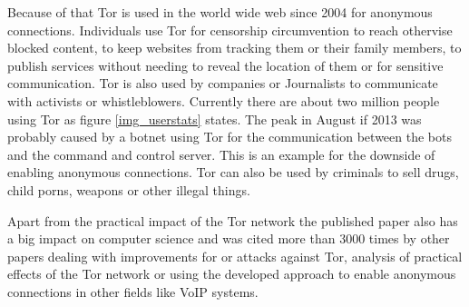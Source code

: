 Because of that Tor is used in the world wide web since 2004 for anonymous connections. Individuals use Tor for censorship circumvention to reach othervise blocked content, to keep websites from tracking them or their family members, to publish services without needing to reveal the location of them or for sensitive communication. Tor is also used by companies or Journalists to communicate with activists or whistleblowers\cite{tor}. Currently there are about two million people using Tor as figure \ref{img_userstats} states. The peak in August if 2013 was probably caused by a botnet using Tor for the communication between the bots and the command and control server\cite{torblog_botnet}. This is an example for the downside of enabling anonymous connections. Tor can also be used by criminals to sell drugs, child porns, weapons or other illegal things.   

Apart from the practical impact of the Tor network the published paper also has a big impact on computer science and was cited more than 3000 times by other papers dealing with improvements for or attacks against Tor, analysis of practical effects of the Tor network or using the developed approach to enable anonymous connections in other fields like VoIP systems.